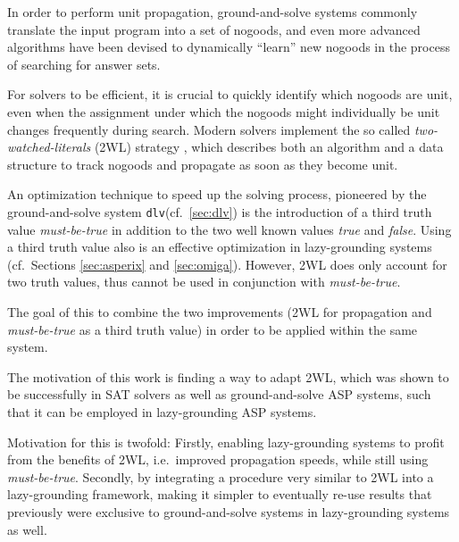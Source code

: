 \documentclass{vutinfth} %
\newcommand{\mbt}{must-be-true\xspace}
\newcommand{\dlv}{\texttt{dlv}\xspace}
\begin{document}
In order to perform unit propagation, ground-and-solve systems commonly translate the input program into a set of nogoods, and even more advanced algorithms have been devised to dynamically \enquote{learn} new nogoods in the process of searching for answer sets. 

For solvers to be efficient, it is crucial to quickly identify which nogoods are unit, even when the assignment under which the nogoods might individually be unit changes frequently during search. Modern solvers implement the so called \emph{two-watched-literals} (2WL) strategy \cite{effsat,questsat}, which describes both an algorithm and a data structure to track nogoods and propagate as soon as they become unit.

An optimization technique to speed up the solving process, pioneered by the ground-and-solve system \dlv (cf.~\ref{sec:dlv}) is the introduction of a third truth value \emph{\mbt} in addition to the two well known values \emph{true} and \emph{false}. Using a third truth value also is an effective optimization in lazy-grounding systems (cf.~Sections \ref{sec:asperix} and \ref{sec:omiga}). However, 2WL does only account for two truth values, thus cannot be used in conjunction with \emph{\mbt}.

The goal of this to combine the two improvements (2WL for propagation and \emph{\mbt} as a third truth value) in order to be applied within the same system.

The motivation of this work is finding a way to adapt 2WL, which was shown to be successfully in SAT solvers as well as ground-and-solve ASP systems, such that it can be employed in lazy-grounding ASP systems.

Motivation for this is twofold: Firstly, enabling lazy-grounding systems to profit from the benefits of 2WL, i.e.~improved propagation speeds, while still using \emph{\mbt}. Secondly, by integrating a procedure very similar to 2WL into a lazy-grounding framework, making it simpler to eventually re-use results that previously were exclusive to ground-and-solve systems in lazy-grounding systems as well.


\end{document}
